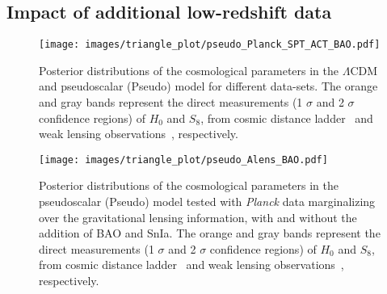 \documentclass[a4paper,11pt]{article}
\begin{document}
\subsection{Impact of additional low-redshift data}\label{sec:lowred}


\begin{figure}[ht]
 \centering
   \texttt{[image: images/triangle\_plot/pseudo\_Planck\_SPT\_ACT\_BAO.pdf]} %
  \caption{Posterior distributions of the cosmological parameters in the $\Lambda$CDM and pseudoscalar (Pseudo) model for different data-sets. The orange and gray bands represent the direct measurements (1 $\sigma$ and 2 $\sigma$ confidence regions) of $H_0$ and $S_8$, from cosmic distance ladder~\cite{Riess:2020fzl} and weak lensing observations~\cite{Gatti:2021uwl}, respectively.
  }
  \label{Fig:pseudo_LCDM_Planck_SPT_ACT_BAO}
\end{figure}



 \begin{figure}[t]
 \centering
   \texttt{[image: images/triangle\_plot/pseudo\_Alens\_BAO.pdf]}  
  \caption{ Posterior distributions of the cosmological parameters in the pseudoscalar (Pseudo) model tested with \emph{Planck} data marginalizing over the gravitational lensing information, with and without the addition of BAO and SnIa. The orange and gray bands represent the direct measurements (1 $\sigma$ and 2 $\sigma$ confidence regions) of $H_0$ and $S_8$, from cosmic distance ladder~\cite{Riess:2020fzl} and weak lensing observations~\cite{Gatti:2021uwl}, respectively. }
  \label{Fig:Pseudo_Alens_BAO}
\end{figure}
\end{document}
